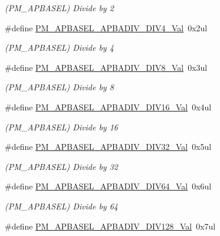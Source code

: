 \begin{DoxyCompactItemize}
\begin{DoxyCompactList}\small\item\em (P\+M\+\_\+\+A\+P\+B\+A\+S\+EL) Divide by 2 \end{DoxyCompactList}\item 
\#define \mbox{\hyperlink{group___s_a_m_d21___p_m_ga3ab1c2dd45cdeda0a30df9c3e060e558}{P\+M\+\_\+\+A\+P\+B\+A\+S\+E\+L\+\_\+\+A\+P\+B\+A\+D\+I\+V\+\_\+\+D\+I\+V4\+\_\+\+Val}}~0x2ul
\begin{DoxyCompactList}\small\item\em (P\+M\+\_\+\+A\+P\+B\+A\+S\+EL) Divide by 4 \end{DoxyCompactList}\item 
\#define \mbox{\hyperlink{group___s_a_m_d21___p_m_ga003b309e1ea26ef35d9d56d66139f05f}{P\+M\+\_\+\+A\+P\+B\+A\+S\+E\+L\+\_\+\+A\+P\+B\+A\+D\+I\+V\+\_\+\+D\+I\+V8\+\_\+\+Val}}~0x3ul
\begin{DoxyCompactList}\small\item\em (P\+M\+\_\+\+A\+P\+B\+A\+S\+EL) Divide by 8 \end{DoxyCompactList}\item 
\#define \mbox{\hyperlink{group___s_a_m_d21___p_m_ga9a16dcd1b5997aa13f799849c76bd2e5}{P\+M\+\_\+\+A\+P\+B\+A\+S\+E\+L\+\_\+\+A\+P\+B\+A\+D\+I\+V\+\_\+\+D\+I\+V16\+\_\+\+Val}}~0x4ul
\begin{DoxyCompactList}\small\item\em (P\+M\+\_\+\+A\+P\+B\+A\+S\+EL) Divide by 16 \end{DoxyCompactList}\item 
\#define \mbox{\hyperlink{group___s_a_m_d21___p_m_ga316fe0f95a4b7baf76df51f184dc470b}{P\+M\+\_\+\+A\+P\+B\+A\+S\+E\+L\+\_\+\+A\+P\+B\+A\+D\+I\+V\+\_\+\+D\+I\+V32\+\_\+\+Val}}~0x5ul
\begin{DoxyCompactList}\small\item\em (P\+M\+\_\+\+A\+P\+B\+A\+S\+EL) Divide by 32 \end{DoxyCompactList}\item 
\#define \mbox{\hyperlink{group___s_a_m_d21___p_m_gaee07af5f5d22318277a0b959140ee832}{P\+M\+\_\+\+A\+P\+B\+A\+S\+E\+L\+\_\+\+A\+P\+B\+A\+D\+I\+V\+\_\+\+D\+I\+V64\+\_\+\+Val}}~0x6ul
\begin{DoxyCompactList}\small\item\em (P\+M\+\_\+\+A\+P\+B\+A\+S\+EL) Divide by 64 \end{DoxyCompactList}\item 
\#define \mbox{\hyperlink{group___s_a_m_d21___p_m_ga9265c041300ed80e29edd9283ce4de4d}{P\+M\+\_\+\+A\+P\+B\+A\+S\+E\+L\+\_\+\+A\+P\+B\+A\+D\+I\+V\+\_\+\+D\+I\+V128\+\_\+\+Val}}~0x7ul

\end{DoxyCompactItemize}
